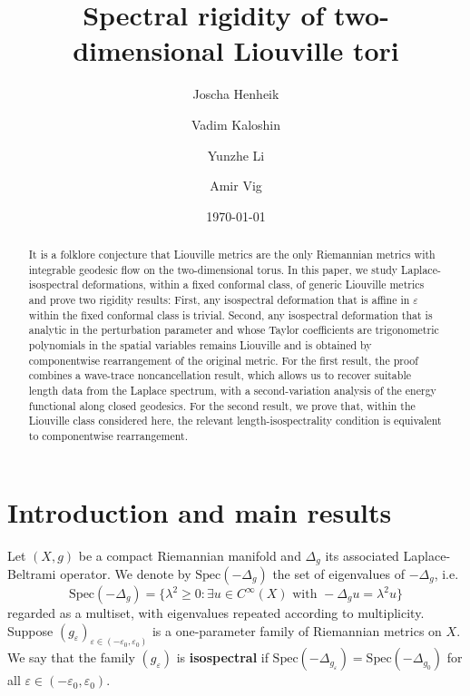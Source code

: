 \documentclass[11pt,letterpaper,oneside]{amsart}
\title{Spectral rigidity of two-dimensional Liouville tori}
\date{\today}
\author{Joscha Henheik}
\author{Vadim Kaloshin}
\author{Yunzhe Li}
\author{Amir Vig}
\renewcommand{\epsilon}{\varepsilon}
\theoremstyle{definition}
\theoremstyle{remark}
\newcommand{\Spec}{\text{Spec}}
\theoremstyle{definition}
\theoremstyle{remark}
\begin{document}
\begin{abstract}
It is a folklore conjecture that Liouville metrics are the only Riemannian metrics with integrable geodesic flow on the two-dimensional torus. In this paper, we study Laplace-isospectral deformations, within a fixed conformal class, of generic Liouville metrics and prove two rigidity results: First, any isospectral deformation that is affine in $\epsilon$ within the fixed conformal class is trivial. Second, any isospectral deformation that is analytic in the perturbation parameter and whose Taylor coefficients are trigonometric polynomials in the spatial variables remains Liouville and is obtained by componentwise rearrangement of the original metric. For the first result, the proof combines a wave-trace noncancellation result, which allows us to recover suitable length data from the Laplace spectrum, with a second-variation analysis of the energy functional along closed geodesics. For the second result, we prove that, within the Liouville class considered here, the relevant length-isospectrality condition is equivalent to componentwise rearrangement.
\end{abstract}



\maketitle



\tableofcontents

\section{Introduction and main results}\label{sec: Introduction and Main Results} 
Let $(X, g)$ be a compact Riemannian manifold and $\Delta_g$ its associated Laplace-Beltrami operator. We denote by $\Spec(-\Delta_g)$ the set of eigenvalues of $-\Delta_g$, i.e.
\begin{equation*}
   \Spec(-\Delta_g) = \{\lambda^2 \geq 0 : \exists u \in C^\infty(X) \text{ with }  -\Delta_g u = \lambda^2 u\}
\end{equation*}
regarded as a multiset, with eigenvalues repeated according to multiplicity. 
Suppose $(g_\epsilon)_{\epsilon \in (-\epsilon_0, \epsilon_0)}$ is a one-parameter family of Riemannian metrics on $X$.
We say that the family $(g_\epsilon)$ is \textbf{isospectral} if $\Spec(-\Delta_{g_\epsilon}) = \Spec(-\Delta_{g_0})$ for all $\epsilon \in (-\epsilon_0, \epsilon_0)$. 
\end{document}
